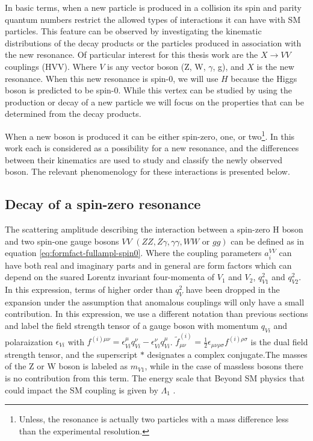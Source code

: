 In basic terms, when a new particle is produced in a collision its spin and parity quantum numbers restrict the allowed types of interactions it can have with SM particles. This feature can be observed by investigating the kinematic distributions of the decay products or the particles produced in association with the new resonance. Of particular interest for this thesis work are the $X \to VV$ couplings (HVV). Where $V$ is any vector boson (Z, W, $\gamma$, g), and $X$ is the new resonance. When this new resonance is spin-0, we will use $H$ because the Higgs boson is predicted to be spin-0. While this vertex can be studied by using the production or decay of a new particle we will focus on the properties that can be determined from the decay products. 

When a new boson is produced it can be either spin-zero, one, or two\footnote{Unless, the resonance is actually two particles with a mass difference less than the experimental resolution.}. In this work each is considered as a possibility for a new resonance, and the differences between their kinematics are used to study and classify the newly observed boson. The relevant phenomenology for these interactions is presented below.

\subsection{Decay of a spin-zero resonance}
\label{sec:Spin0_Pheno}

The scattering amplitude describing the interaction between a spin-zero H boson and two spin-one gauge bosons $VV$ $\left(ZZ, Z\gamma, \gamma\gamma, WW \text{ or } gg\right)$ can be defined as in equation \eqref{eq:formfact-fullampl-spin0}. Where the coupling parameters $a_{i}^{VV}$ can have both real and imaginary parts and in general are form factors which can depend on the suared Lorentz invariant four-momenta of $V_{1}$ and $V_{2}$, $q_{V1}^2$ and $q_{V2}^2$. In this expression, terms of higher order than $q_{V}^2$ have been dropped in the expansion under the assumption that anomalous couplings will only have a small contribution. In this expression, we use a different notation than previous sections and label the field strength tensor of a gauge boson with momentum $q_{Vi}$ and polaraization $\epsilon_{Vi}$ with $f^{\left(i\right) \mu \nu} = \epsilon^{\mu}_{Vi}q_{Vi}^{\nu} - \epsilon^{\nu}_{Vi}q_{Vi}^{\mu}$. ${\tilde f}^{\left(i\right)}_{\mu \nu} = \frac{1}{2}\epsilon_{\mu\nu\rho\sigma}f^{\left(i\right) \rho \sigma}$ is the dual field strength tensor, and the superscript $*$ designates a complex conjugate.The masses of the Z or W boson is labeled as $m_{V1}$, while in the case of massless bosons there is no contribution from this term. The energy scale that Beyond SM physics that could impact the SM coupling is given by $\Lambda_{1}$ \cite{Anderson:2013afp}. 

